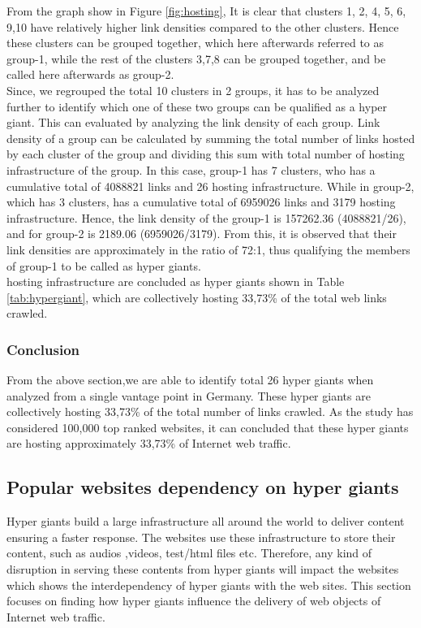 \noindent From the graph show in Figure \ref{fig:hosting}, It is clear that clusters 1, 2, 4, 5, 6, 9,10 have relatively higher link densities compared to the other clusters. Hence these clusters can be grouped together, which here afterwards referred to as group-1, while the rest of the clusters 3,7,8 can be grouped together, and be called here afterwards as group-2.\\

\noindent Since, we regrouped the total 10 clusters in 2 groups, it has to be analyzed further to identify which one of these two groups can be qualified as a hyper giant. This can evaluated by analyzing the link density of each group. Link density of a group can be calculated by summing the total number of links hosted by each cluster of the group and dividing this sum with total number of hosting infrastructure of the group. In this case, group-1 has 7 clusters, who has a cumulative total of  4088821 links and 26 hosting infrastructure. While in group-2, which has 3 clusters, has a cumulative total of  6959026 links and 3179 hosting infrastructure. Hence, the link density of the group-1 is 157262.36 (4088821/26), and for group-2 is 2189.06 (6959026/3179). From this, it is observed that their link densities are approximately in the ratio of 72:1, thus qualifying the members of group-1 to be called as hyper giants.\\

 hosting infrastructure are concluded as hyper giants shown in Table \ref{tab:hypergiant}, which are collectively hosting 33,73\% of the total web links crawled.\\

\subsubsection{Conclusion}
\noindent From the above section,we are able to identify total 26 hyper giants when analyzed from a single vantage point in Germany. These hyper giants are collectively hosting 33,73\% of the total number of links crawled. As the study has considered 100,000 top ranked websites, it can concluded that these hyper giants are hosting approximately 33,73\% of Internet web traffic. \\

\subsection{Popular websites dependency on hyper giants}
\noindent Hyper giants build a large infrastructure all around the world to deliver content ensuring a faster response. The websites use these infrastructure to store their content, such as audios ,videos, test/html files etc. Therefore, any kind of disruption in serving these contents from hyper giants will impact the websites which shows the interdependency of hyper giants with the web sites.
This section focuses on finding how hyper giants influence the delivery of web objects of Internet web traffic. \\
 
